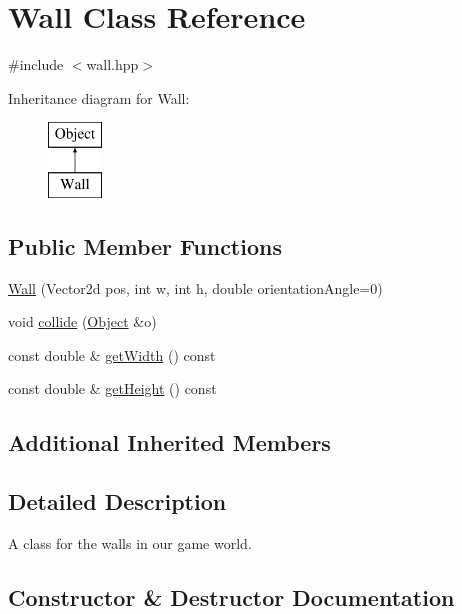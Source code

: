 \hypertarget{classWall}{}\section{Wall Class Reference}
\label{classWall}


{\ttfamily \#include $<$wall.\+hpp$>$}

Inheritance diagram for Wall\+:\begin{figure}[H]
\begin{center}
\leavevmode
\includegraphics[height=2.000000cm]{classWall}
\end{center}
\end{figure}
\subsection*{Public Member Functions}
\begin{DoxyCompactItemize}
\item 
\hyperlink{classWall_a769393b378fa304cfe1f1c10e9283514}{Wall} (Vector2d pos, int w, int h, double orientation\+Angle=0)
\item 
void \hyperlink{classWall_aae68a37386f56e928ccdbd55c4464550}{collide} (\hyperlink{classObject}{Object} \&o)
\item 
const double \& \hyperlink{classWall_a98f9c3ef8a89ee2622e1cf84df093a2d}{get\+Width} () const
\item 
const double \& \hyperlink{classWall_a9be8bb3c3696aeaf01b3d9dfaf9462cf}{get\+Height} () const
\end{DoxyCompactItemize}
\subsection*{Additional Inherited Members}


\subsection{Detailed Description}
A class for the walls in our game world. 

\subsection{Constructor \& Destructor Documentation}
\hypertarget{classWall_a769393b378fa304cfe1f1c10e9283514}{}\label{classWall_a769393b378fa304cfe1f1c10e9283514} 

